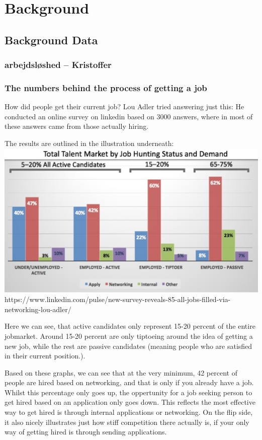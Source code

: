 \section{Background}\label{sec:background}



\subsection{Background Data}

\subsubsection{arbejdsløshed -- Kristoffer}


\subsubsection{The numbers behind the process of getting a job}
How did people get their current job?
Lou Adler tried answering just this: He conducted an online survey 
on linkedin based on 3000 answers, where in most of these answers 
came from those actually hiring. 

The results are outlined in the illustration underneath:
\includegraphics{figures/hiringpeople.bmp}
https://www.linkedin.com/pulse/new-survey-reveals-85-all-jobs-filled-via-networking-lou-adler/

Here we can see, that active candidates only represent 15-20 percent of the
entire jobmarket. Around 15-20 percent are only tiptoeing around the idea 
of getting a new job, while the rest are passive candidates (meaning people who are 
satisfied in their current position.).

Based on these graphs, we can see that at the very minimum, 42 percent of people are 
hired based on networking, and that is only if you already have a job. 
Whilst this percentage only goes up, the oppertunity for a job seeking person
to get hired based on an application only goes down. This reflects the 
most effective way to get hired is through internal applications or networking.  
On the flip side, it also nicely illustrates just how stiff competition there actually is,
if your only way of getting hired is through sending applications.


